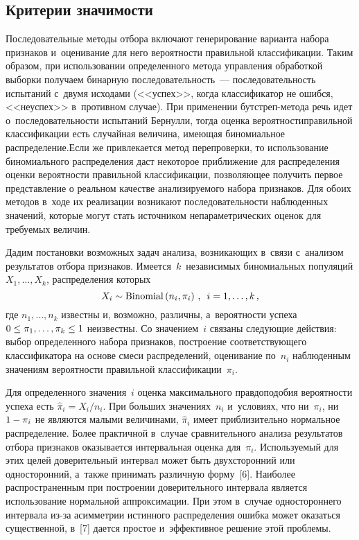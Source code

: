 \begin{multicols}{2}
\section{Критерии значимости}

     Последовательные методы отбора включают генерирование варианта 
набора признаков и~оценивание для него вероятности правильной 
классификации. Таким образом, при использовании определенного метода 
управления обработкой выборки получаем бинарную последовательность~--- 
последовательность испытаний с~двумя исходами (<<успех>>, когда 
классификатор не ошибся, <<не\-успех>> в~противном случае). При применении 
бут\-стреп-ме\-то\-да речь идет о~последовательности испытаний Бернулли, 
тогда оценка вероятности\linebreak правиль\-ной классификации есть случайная величина, 
имеющая биномиальное распределение.\linebreak Если же привлекается метод 
перепроверки, то использование биномиального распределения даст некоторое 
приближение для распределения оценки вероятности правильной 
классификации, позволяющее получить первое представление о реальном 
качестве анализируемого набора признаков. Для обоих методов в~ходе их 
реализации возникают последовательности наблюденных значений, которые 
могут стать источником непараметрических оценок для требуемых величин.
     
     Дадим постановки возможных задач анализа, возникающих в~связи 
с~анализом результатов отбора признаков. Имеется~$k$~независимых 
биномиальных популяций $X_1,\ldots ,X_k$, распределения которых
     $$
     X_i\sim \mathrm{Binomial}\left (n_i, \pi_i\right)\,,\enskip i=1,\ldots, k\,,
     $$
где $n_1,\ldots ,n_k$ известны и, возможно, различны, а~вероятности успеха 
$0\hm\leq \pi_1,\ldots, \pi_k\hm\leq 1$ неизвестны. Со значением~$i$ связаны 
следующие действия: выбор определенного набора признаков, по\-стро\-ение 
соответствующего классификатора на основе смеси распределений, оценивание 
по~$n_i$ наблюденным значениям вероятности правильной 
классификации~$\pi_i$. 

     Для определенного значения~$i$ оценка максимального правдоподобия 
вероятности успеха есть $\hat{\pi}_i=X_i/n_i$. При больших значениях~$n_i$ 
и~условиях, что ни~$\pi_i$, ни $1\hm- \pi_i$ не являются малыми величинами, 
$\hat{\pi}_i$ имеет приблизительно нормальное распределение. Более 
практичной в~случае сравнительного анализа результатов отбора признаков 
оказывается интервальная оценка для~$\pi_i$. Используемый для этих целей 
доверительный интервал может быть двухсторонний или односторонний, 
а~также принимать различную форму~[6]. Наиболее распространенным при 
построении доверительного интервала является использование нормальной 
аппроксимации. При этом в~случае одностороннего интервала из-за асимметрии 
истинного распределения ошибка может оказаться существенной, в~[7] дается 
простое и~эффективное решение этой проб\-лемы. 
     

\end{multicols}
